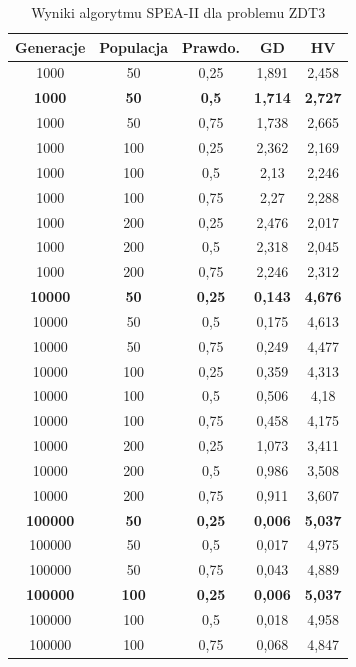 \documentclass{classrep}
\begin{document}
\begin{table}[H]
\centering
\caption{Wyniki algorytmu SPEA-II dla problemu ZDT3}
\label{tab:SPEAII_ZDT3}
\begin{tabular}{|ccc|c|c|}
\hline
\textbf{Generacje} & \textbf{Populacja} & \textbf{Prawdo.} & \textbf{GD} & \textbf{HV} \\ \hline
1000 & 50 & 0,25 & 1,891 & 2,458 \\ \hline
\textbf{1000} & \textbf{50} & \textbf{0,5} & \textbf{1,714} & \textbf{2,727} \\ \hline
1000 & 50 & 0,75 & 1,738 & 2,665 \\ \hline
1000 & 100 & 0,25 & 2,362 & 2,169 \\ \hline
1000 & 100 & 0,5 & 2,13 & 2,246 \\ \hline
1000 & 100 & 0,75 & 2,27 & 2,288 \\ \hline
1000 & 200 & 0,25 & 2,476 & 2,017 \\ \hline
1000 & 200 & 0,5 & 2,318 & 2,045 \\ \hline
1000 & 200 & 0,75 & 2,246 & 2,312 \\ \hline
\textbf{10000} & \textbf{50} & \textbf{0,25} & \textbf{0,143} & \textbf{4,676} \\ \hline
10000 & 50 & 0,5 & 0,175 & 4,613 \\ \hline
10000 & 50 & 0,75 & 0,249 & 4,477 \\ \hline
10000 & 100 & 0,25 & 0,359 & 4,313 \\ \hline
10000 & 100 & 0,5 & 0,506 & 4,18 \\ \hline
10000 & 100 & 0,75 & 0,458 & 4,175 \\ \hline
10000 & 200 & 0,25 & 1,073 & 3,411 \\ \hline
10000 & 200 & 0,5 & 0,986 & 3,508 \\ \hline
10000 & 200 & 0,75 & 0,911 & 3,607 \\ \hline
\textbf{100000} & \textbf{50} & \textbf{0,25} & \textbf{0,006} & \textbf{5,037} \\ \hline
100000 & 50 & 0,5 & 0,017 & 4,975 \\ \hline
100000 & 50 & 0,75 & 0,043 & 4,889 \\ \hline
\textbf{100000} & \textbf{100} & \textbf{0,25} & \textbf{0,006} & \textbf{5,037} \\ \hline
100000 & 100 & 0,5 & 0,018 & 4,958 \\ \hline
100000 & 100 & 0,75 & 0,068 & 4,847 \\ \hline
\end{tabular}
\end{table}
\end{document}
